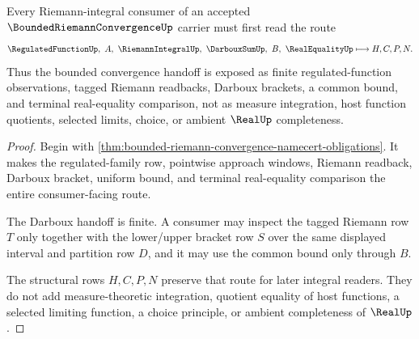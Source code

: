 \begin{theorem}
\label{thm:bounded-riemann-convergence-darboux-handoff}
Every Riemann-integral consumer of an accepted $\BoundedRiemannConvergenceUp$ carrier must first read the route
$$
\RegulatedFunctionUp,\ A,\ \RiemannIntegralUp,\ \DarbouxSumUp,\ B,\ \RealEqualityUp \longmapsto H,C,P,N .
$$
Thus the bounded convergence handoff is exposed as finite regulated-function observations, tagged Riemann readbacks, Darboux brackets, a common bound, and terminal real-equality comparison, not as measure integration, host function quotients, selected limits, choice, or ambient $\RealUp$ completeness.
\end{theorem}
\begin{proof}
Begin with \autoref{thm:bounded-riemann-convergence-namecert-obligations}. It makes the regulated-family row, pointwise approach windows, Riemann readback, Darboux bracket, uniform bound, and terminal real-equality comparison the entire consumer-facing route.

The Darboux handoff is finite. A consumer may inspect the tagged Riemann row $T$ only together with the lower/upper bracket row $S$ over the same displayed interval and partition row $D$, and it may use the common bound only through $B$.

The structural rows $H,C,P,N$ preserve that route for later integral readers. They do not add measure-theoretic integration, quotient equality of host functions, a selected limiting function, a choice principle, or ambient completeness of $\RealUp$.
\end{proof}



